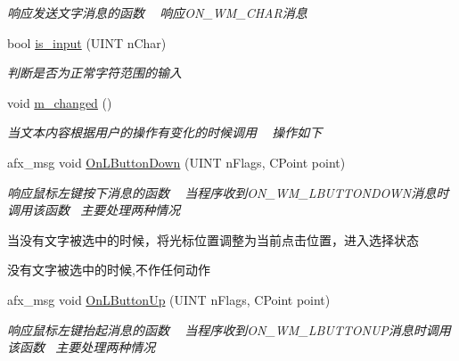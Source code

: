 \begin{DoxyCompactItemize}
\begin{DoxyCompactList}\small\item\em 响应发送文字消息的函数 ~\newline
响应\+O\+N\+\_\+\+W\+M\+\_\+\+C\+H\+A\+R消息 \end{DoxyCompactList}\item 
bool \hyperlink{class_c_child_view_a32656902f423e5c809ca20f3013fc107}{is\+\_\+input} (U\+I\+NT n\+Char)
\begin{DoxyCompactList}\small\item\em 判断是否为正常字符范围的输入 \end{DoxyCompactList}\item 
void \hyperlink{class_c_child_view_acff91e8fc8cc40cd1ebe1d24a6be4945}{m\+\_\+changed} ()
\begin{DoxyCompactList}\small\item\em 当文本内容根据用户的操作有变化的时候调用 ~\newline
操作如下~\newline
\end{DoxyCompactList}\item 
afx\+\_\+msg void \hyperlink{class_c_child_view_af513a57c45ce8b9dcc09dd934e228534}{On\+L\+Button\+Down} (U\+I\+NT n\+Flags, C\+Point point)
\begin{DoxyCompactList}\small\item\em 响应鼠标左键按下消息的函数 ~\newline
当程序收到\+O\+N\+\_\+\+W\+M\+\_\+\+L\+B\+U\+T\+T\+O\+N\+D\+O\+W\+N消息时调用该函数~\newline
主要处理两种情况~\newline

\begin{DoxyEnumerate}
\item 当没有文字被选中的时候，将光标位置调整为当前点击位置，进入选择状态
\item 没有文字被选中的时候,不作任何动作 
\end{DoxyEnumerate}\end{DoxyCompactList}\item 
afx\+\_\+msg void \hyperlink{class_c_child_view_ae81948a77ebf3744bd0f9449af57ee21}{On\+L\+Button\+Up} (U\+I\+NT n\+Flags, C\+Point point)
\begin{DoxyCompactList}\small\item\em 响应鼠标左键抬起消息的函数 ~\newline
当程序收到\+O\+N\+\_\+\+W\+M\+\_\+\+L\+B\+U\+T\+T\+O\+N\+U\+P消息时调用该函数~\newline
主要处理两种情况~\newline


\end{DoxyCompactList}
\end{DoxyCompactItemize}
